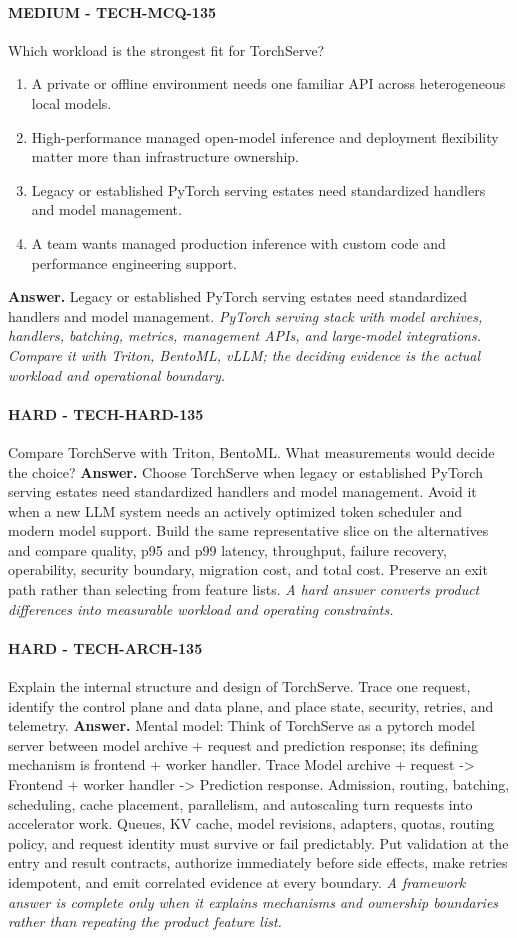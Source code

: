 \paragraph{MEDIUM - TECH-MCQ-135} Which workload is the strongest fit for TorchServe?
\begin{enumerate}[label=\Alph*.]
\item A private or offline environment needs one familiar API across heterogeneous local models.
\item High-performance managed open-model inference and deployment flexibility matter more than infrastructure ownership.
\item Legacy or established PyTorch serving estates need standardized handlers and model management.
\item A team wants managed production inference with custom code and performance engineering support.
\end{enumerate}
\textbf{Answer.} Legacy or established PyTorch serving estates need standardized handlers and model management.
\textit{PyTorch serving stack with model archives, handlers, batching, metrics, management APIs, and large-model integrations. Compare it with Triton, BentoML, vLLM; the deciding evidence is the actual workload and operational boundary.}
\paragraph{HARD - TECH-HARD-135} Compare TorchServe with Triton, BentoML. What measurements would decide the choice?
\textbf{Answer.} Choose TorchServe when legacy or established PyTorch serving estates need standardized handlers and model management. Avoid it when a new LLM system needs an actively optimized token scheduler and modern model support. Build the same representative slice on the alternatives and compare quality, p95 and p99 latency, throughput, failure recovery, operability, security boundary, migration cost, and total cost. Preserve an exit path rather than selecting from feature lists.
\textit{A hard answer converts product differences into measurable workload and operating constraints.}
\paragraph{HARD - TECH-ARCH-135} Explain the internal structure and design of TorchServe. Trace one request, identify the control plane and data plane, and place state, security, retries, and telemetry.
\textbf{Answer.} Mental model: Think of TorchServe as a pytorch model server between model archive + request and prediction response; its defining mechanism is frontend + worker handler. Trace Model archive + request -> Frontend + worker handler -> Prediction response. Admission, routing, batching, scheduling, cache placement, parallelism, and autoscaling turn requests into accelerator work. Queues, KV cache, model revisions, adapters, quotas, routing policy, and request identity must survive or fail predictably. Put validation at the entry and result contracts, authorize immediately before side effects, make retries idempotent, and emit correlated evidence at every boundary.
\textit{A framework answer is complete only when it explains mechanisms and ownership boundaries rather than repeating the product feature list.}

